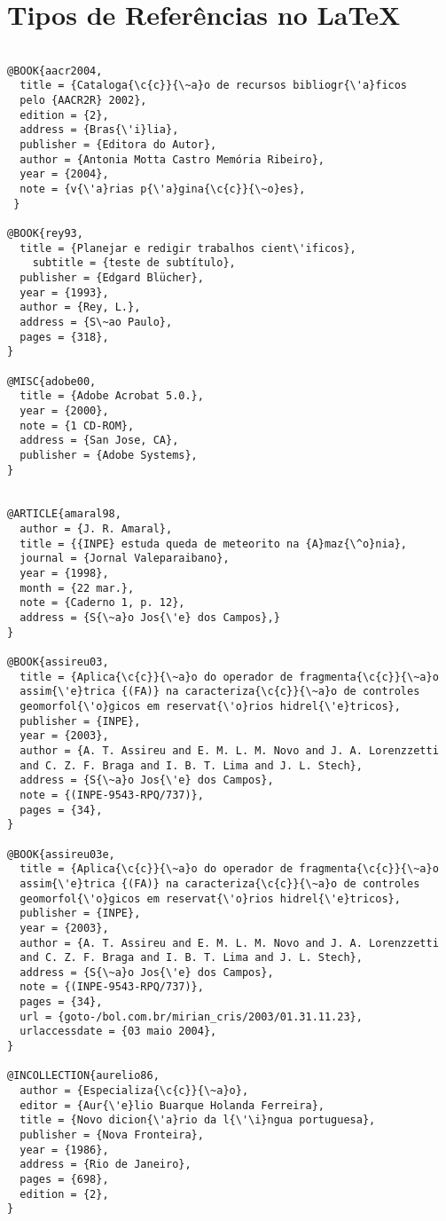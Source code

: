 \chapter{Tipos de Referências no \LaTeX}
\label{anexo:referencias}

\begin{verbatim}

@BOOK{aacr2004, 
  title = {Cataloga{\c{c}}{\~a}o de recursos bibliogr{\'a}ficos 
  pelo {AACR2R} 2002}, 
  edition = {2},
  address = {Bras{\'i}lia},
  publisher = {Editora do Autor},
  author = {Antonia Motta Castro Memória Ribeiro},
  year = {2004}, 
  note = {v{\'a}rias p{\'a}gina{\c{c}}{\~o}es},
 }

@BOOK{rey93,
  title = {Planejar e redigir trabalhos cient\'ificos},
	subtitle = {teste de subtítulo},
  publisher = {Edgard Blücher},
  year = {1993},
  author = {Rey, L.},
  address = {S\~ao Paulo},
  pages = {318},
} 

@MISC{adobe00,
  title = {Adobe Acrobat 5.0.},
  year = {2000},
  note = {1 CD-ROM},
  address = {San Jose, CA},
  publisher = {Adobe Systems},
}


@ARTICLE{amaral98,
  author = {J. R. Amaral},
  title = {{INPE} estuda queda de meteorito na {A}maz{\^o}nia},
  journal = {Jornal Valeparaibano},
  year = {1998},
  month = {22 mar.},
  note = {Caderno 1, p. 12},
  address = {S{\~a}o Jos{\'e} dos Campos},}
}

@BOOK{assireu03,
  title = {Aplica{\c{c}}{\~a}o do operador de fragmenta{\c{c}}{\~a}o  
  assim{\'e}trica {(FA)} na caracteriza{\c{c}}{\~a}o de controles 
  geomorfol{\'o}gicos em reservat{\'o}rios hidrel{\'e}tricos},
  publisher = {INPE},
  year = {2003},
  author = {A. T. Assireu and E. M. L. M. Novo and J. A. Lorenzzetti 
  and C. Z.	F. Braga and I. B. T. Lima and J. L. Stech},
  address = {S{\~a}o Jos{\'e} dos Campos},
  note = {(INPE-9543-RPQ/737)},
  pages = {34},
}

@BOOK{assireu03e,
  title = {Aplica{\c{c}}{\~a}o do operador de fragmenta{\c{c}}{\~a}o 
  assim{\'e}trica {(FA)} na caracteriza{\c{c}}{\~a}o de controles 
  geomorfol{\'o}gicos em reservat{\'o}rios hidrel{\'e}tricos},
  publisher = {INPE},
  year = {2003},
  author = {A. T. Assireu and E. M. L. M. Novo and J. A. Lorenzzetti 
  and C. Z.	F. Braga and I. B. T. Lima and J. L. Stech},
  address = {S{\~a}o Jos{\'e} dos Campos},
  note = {(INPE-9543-RPQ/737)},
  pages = {34},
  url = {goto-/bol.com.br/mirian_cris/2003/01.31.11.23},
  urlaccessdate = {03 maio 2004},
}

@INCOLLECTION{aurelio86, 
  author = {Especializa{\c{c}}{\~a}o},
  editor = {Aur{\'e}lio Buarque Holanda Ferreira},  
  title = {Novo dicion{\'a}rio da l{\'\i}ngua portuguesa},
  publisher = {Nova Fronteira},
  year = {1986},
  address = {Rio de Janeiro}, 
  pages = {698},
  edition = {2},
}


\end{verbatim}
